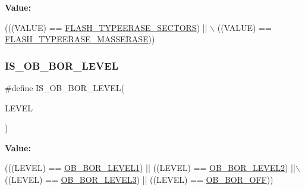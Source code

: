 {\bfseries Value\+:}
\begin{DoxyCode}
(((VALUE) == \hyperlink{group___f_l_a_s_h_ex___type___erase_gaee700cbbc746cf72fca3ebf07ee20c4e}{FLASH\_TYPEERASE\_SECTORS}) || \(\backslash\)
                                  ((VALUE) == \hyperlink{group___f_l_a_s_h_ex___type___erase_ga9bc03534e69c625e1b4f0f05c3852243}{FLASH\_TYPEERASE\_MASSERASE}))
\end{DoxyCode}
\mbox{\label{group___f_l_a_s_h_ex___i_s___f_l_a_s_h___definitions_gac97ecd832fce5f4b4ff9ef7bc4493013}} 
\subsubsection{\texorpdfstring{I\+S\+\_\+\+O\+B\+\_\+\+B\+O\+R\+\_\+\+L\+E\+V\+EL}{IS\_OB\_BOR\_LEVEL}}
{\footnotesize\ttfamily \#define I\+S\+\_\+\+O\+B\+\_\+\+B\+O\+R\+\_\+\+L\+E\+V\+EL(\begin{DoxyParamCaption}\item[{}]{L\+E\+V\+EL }\end{DoxyParamCaption})}

{\bfseries Value\+:}
\begin{DoxyCode}
(((LEVEL) == \hyperlink{group___f_l_a_s_h_ex___b_o_r___reset___level_ga3a888b788e75f0bc1f9add85c9ccd9d6}{OB\_BOR\_LEVEL1}) || ((LEVEL) == \hyperlink{group___f_l_a_s_h_ex___b_o_r___reset___level_gad678e849fcf817f6ed2d837538e8ebc2}{OB\_BOR\_LEVEL2}) ||\(\backslash\)
                                ((LEVEL) == \hyperlink{group___f_l_a_s_h_ex___b_o_r___reset___level_ga3132b8202c0a345e9dd33d136714b046}{OB\_BOR\_LEVEL3}) || ((LEVEL) == 
      \hyperlink{group___f_l_a_s_h_ex___b_o_r___reset___level_gaabc231cb1d05a94fe860f67bb5a37b12}{OB\_BOR\_OFF}))
\end{DoxyCode}
\mbox{\label{group___f_l_a_s_h_ex___i_s___f_l_a_s_h___definitions_ga8d602a97cd688390b3d1956d9970e712}} 

